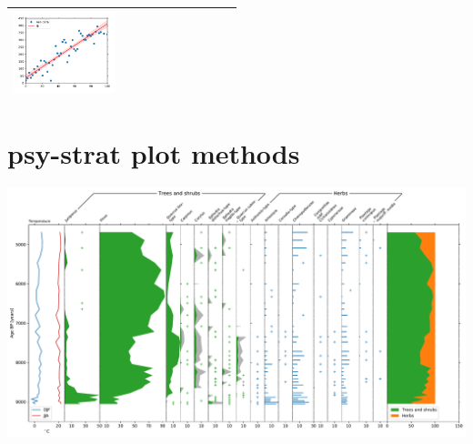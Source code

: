\begin{refsection}
\begin{subappendices}
\begin{tabular}{l|p{0.25\linewidth}|p{0.25\linewidth}|}
				\includegraphics[width=\linewidth, page=4]{psyplot-figures/psy-reg-demo.pdf} \\
			\bottomrule
		\end{tabular}
	
	\section{psy-strat plot methods}  \label{sec:psy-strat-plotmethods}

		\includegraphics[width=\linewidth]{psyplot-figures/psy-strat-demo.pdf}

\end{subappendices}\

\printbibliography[heading=subbibintoc]

\end{refsection}